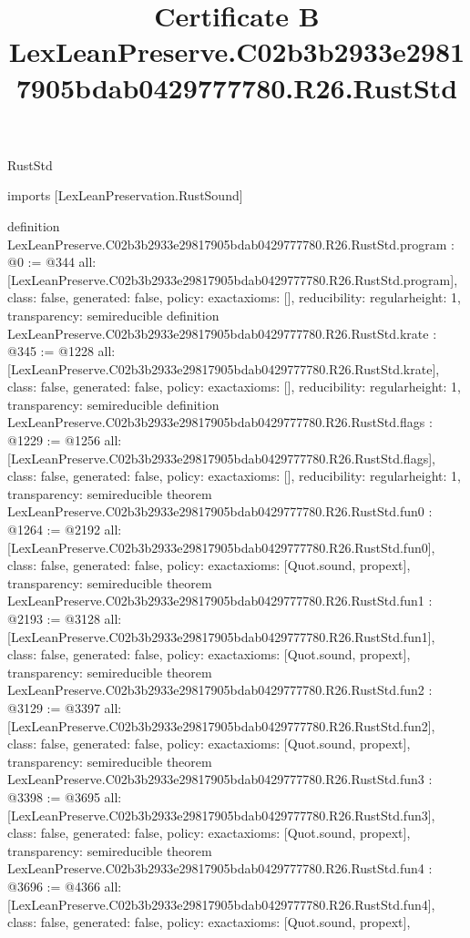 \begin{lexlean}{RustStd}
\title{Certificate B LexLeanPreserve.C02b3b2933e29817905bdab0429777780.R26.RustStd}
\begin{coremodule}
imports [LexLeanPreservation.RustSound]

definition LexLeanPreserve.C02b3b2933e29817905bdab0429777780.R26.RustStd.program : @0 := @344 {
  all: [LexLeanPreserve.C02b3b2933e29817905bdab0429777780.R26.RustStd.program],
  class: false,
  generated: false,
  policy: exact{axioms: []},
  reducibility: regular{height: 1},
  transparency: semireducible
}
definition LexLeanPreserve.C02b3b2933e29817905bdab0429777780.R26.RustStd.krate : @345 := @1228 {
  all: [LexLeanPreserve.C02b3b2933e29817905bdab0429777780.R26.RustStd.krate],
  class: false,
  generated: false,
  policy: exact{axioms: []},
  reducibility: regular{height: 1},
  transparency: semireducible
}
definition LexLeanPreserve.C02b3b2933e29817905bdab0429777780.R26.RustStd.flags : @1229 := @1256 {
  all: [LexLeanPreserve.C02b3b2933e29817905bdab0429777780.R26.RustStd.flags],
  class: false,
  generated: false,
  policy: exact{axioms: []},
  reducibility: regular{height: 1},
  transparency: semireducible
}
theorem LexLeanPreserve.C02b3b2933e29817905bdab0429777780.R26.RustStd.fun0 : @1264 := @2192 {
  all: [LexLeanPreserve.C02b3b2933e29817905bdab0429777780.R26.RustStd.fun0],
  class: false,
  generated: false,
  policy: exact{axioms: [Quot.sound, propext]},
  transparency: semireducible
}
theorem LexLeanPreserve.C02b3b2933e29817905bdab0429777780.R26.RustStd.fun1 : @2193 := @3128 {
  all: [LexLeanPreserve.C02b3b2933e29817905bdab0429777780.R26.RustStd.fun1],
  class: false,
  generated: false,
  policy: exact{axioms: [Quot.sound, propext]},
  transparency: semireducible
}
theorem LexLeanPreserve.C02b3b2933e29817905bdab0429777780.R26.RustStd.fun2 : @3129 := @3397 {
  all: [LexLeanPreserve.C02b3b2933e29817905bdab0429777780.R26.RustStd.fun2],
  class: false,
  generated: false,
  policy: exact{axioms: [Quot.sound, propext]},
  transparency: semireducible
}
theorem LexLeanPreserve.C02b3b2933e29817905bdab0429777780.R26.RustStd.fun3 : @3398 := @3695 {
  all: [LexLeanPreserve.C02b3b2933e29817905bdab0429777780.R26.RustStd.fun3],
  class: false,
  generated: false,
  policy: exact{axioms: [Quot.sound, propext]},
  transparency: semireducible
}
theorem LexLeanPreserve.C02b3b2933e29817905bdab0429777780.R26.RustStd.fun4 : @3696 := @4366 {
  all: [LexLeanPreserve.C02b3b2933e29817905bdab0429777780.R26.RustStd.fun4],
  class: false,
  generated: false,
  policy: exact{axioms: [Quot.sound, propext]},
}
\end{coremodule}
\end{lexlean}
